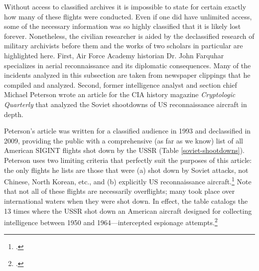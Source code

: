 \documentclass[14pt]{extarticle}
\begin{document}
Without access to classified archives it is impossible to state for certain exactly how many of these flights were conducted. Even if one did have unlimited access, some of the necessary information was so highly classified that it is likely lost forever. Nonetheless, the civilian researcher is aided by the declassified research of military archivists before them and the works of two scholars in particular are highlighted here. First, Air Force Academy historian Dr. John Farquhar specializes in aerial reconnaissance and its diplomatic consequences. Many of the incidents analyzed in this subsection are taken from newspaper clippings that he compiled and analyzed. Second, former intelligence analyst and section chief Michael Peterson wrote an article for the CIA history magazine \emph{Cryptologic Quarterly} that analyzed the Soviet shootdowns of US reconnaissance aircraft in depth.

Peterson's article was written for a classified audience in 1993 and declassified in 2009, providing the public with a comprehensive (as far as we know) list of all American SIGINT flights shot down by the USSR (Table \ref{soviet-shootdowns}). Peterson uses two limiting criteria that perfectly suit the purposes of this article: the only flights he lists are those that were (a) shot down by Soviet attacks, not Chinese, North Korean, etc., and (b) explicitly US reconnaissance aircraft.\footcite[p.~4]{peterson_maybe_1993} Note that not all of these flights are necessarily overflights; many took place over international waters when they were shot down. In effect, the table catalogs the 13 times where the USSR shot down an American aircraft designed for collecting intelligence between 1950 and 1964---intercepted espionage attempts.\footcite[p.~5. In the original document, this table lists the first incident as having taken place over the Barents Sea, not the Baltic Sea. Because the description of the mission---including a map of its route in the same document---takes place entirely over the Baltic sea, I have concluded that this has to be a typographical error, and corrected it here.]{peterson_maybe_1993}
\end{document}
